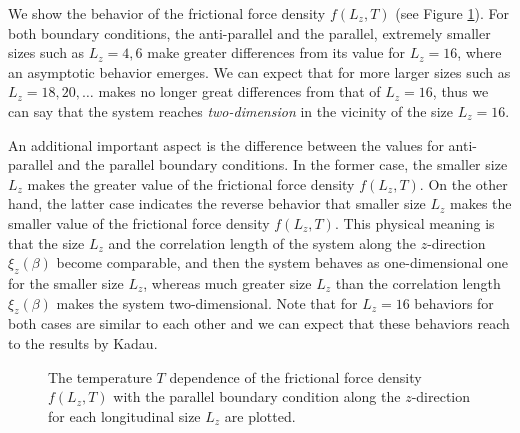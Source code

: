 We show the behavior of the frictional force density $f(L_{z}, T)$ (see Figure \ref{fig:fricDens_Allsize}). For both  boundary conditions, the anti-parallel and the parallel, extremely smaller sizes such as $L_{z}=4,6$ make greater differences from its value for $L_{z}=16$, where an asymptotic behavior emerges. We can expect that for more larger sizes such as $L_{z}=18,20,\dots$ makes no longer great differences from that of $L_{z}=16$, thus we can say that the system reaches \textit{two-dimension} in the vicinity of the size $L_{z}=16$.

An additional important aspect is the difference between the values for anti-parallel and the parallel boundary conditions. In the former case, the smaller size $L_{z}$ makes the greater value of the frictional force density $f(L_{z}, T)$. On the other hand, the latter case indicates the reverse behavior that smaller size $L_{z}$ makes the smaller value of the frictional force density $f(L_{z}, T)$. This physical meaning is that the size $L_{z}$ and the correlation length of the system along the $z$-direction $\xi_{z}(\beta)$ become comparable, and then the system behaves as one-dimensional one for the smaller size $L_{z}$, whereas much greater size $L_{z}$ than the correlation length $\xi_{z}(\beta)$ makes the system two-dimensional. Note that for $L_{z}=16$ behaviors for both cases are similar to each other and we can expect that these behaviors reach to the results by Kadau\cite{Kadau2008}.

\begin{figure}[htbp]
	\centering
	
	\caption{The temperature $T$ dependence of the frictional force density $f(L_{z}, T)$ with the parallel boundary condition along the $z$-direction for each longitudinal size $L_{z}$ are plotted.}
	\label{fig:fricDens_Allsize}
\end{figure}

